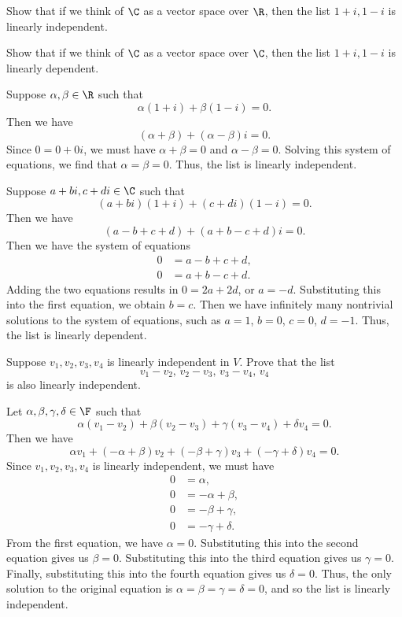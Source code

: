 \begin{exercise}\leavevmode
\begin{parts}
\item Show that if we think of $\C$ as a vector space over $\R$, then the list
  $1+i,1-i$ is linearly independent.
\item Show that if we think of $\C$ as a vector space over $\C$, then the list
  $1+i,1-i$ is linearly dependent.
\end{parts}
\end{exercise}
\begin{solution}\leavevmode
\begin{parts}
\item Suppose $\alpha,\beta\in\R$ such that
  \[ \alpha(1+i)+\beta(1-i)=0. \]
  Then we have
  \[ (\alpha+\beta)+(\alpha-\beta)i=0. \]
  Since $0=0+0i$, we must have $\alpha+\beta=0$ and $\alpha-\beta=0$. Solving
  this system of equations, we find that $\alpha=\beta=0$. Thus, the list is
  linearly independent.
\item Suppose $a+bi,c+di\in\C$ such that
  \[ (a+bi)(1+i)+(c+di)(1-i)=0. \]
  Then we have
  \[ (a-b+c+d)+(a+b-c+d)i=0. \]
  Then we have the system of equations
  \begin{align*}
  0 &= a-b+c+d,\\
  0 &= a+b-c+d.
  \end{align*}
  Adding the two equations results in $0=2a+2d$, or $a=-d$. Substituting this
  into the first equation, we obtain $b=c$. Then we have infinitely many
  nontrivial solutions to the system of equations, such as $a=1$, $b=0$,
  $c=0$, $d=-1$. Thus, the list is linearly dependent.
\end{parts}
\end{solution}

\begin{exercise}
Suppose $v_1,v_2,v_3,v_4$ is linearly independent in $V$. Prove that the list
\[ v_1-v_2,\,v_2-v_3,\,v_3-v_4,\,v_4 \]
is also linearly independent.
\end{exercise}
\begin{solution}
Let $\alpha,\beta,\gamma,\delta\in\F$ such that
\[ \alpha(v_1-v_2)+\beta(v_2-v_3)+\gamma(v_3-v_4)+\delta v_4=0. \]
Then we have
\[ \alpha v_1+(-\alpha+\beta)v_2+(-\beta+\gamma)v_3+(-\gamma+\delta)v_4=0. \]
Since $v_1,v_2,v_3,v_4$ is linearly independent, we must have
\begin{align*}
0 &= \alpha,\\
0 &= -\alpha+\beta,\\
0 &= -\beta+\gamma,\\
0 &= -\gamma+\delta.
\end{align*}
From the first equation, we have $\alpha=0$. Substituting this into the second
equation gives us $\beta=0$. Substituting this into the third equation gives
us $\gamma=0$. Finally, substituting this into the fourth equation gives us
$\delta=0$. Thus, the only solution to the original equation is
$\alpha=\beta=\gamma=\delta=0$, and so the list is linearly independent.
\end{solution}

